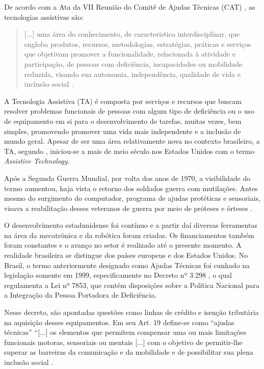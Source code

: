 \documentclass[portuguese]{textolivre}
\begin{document}
De acordo com a Ata da VII Reunião do
Comitê de Ajudas Técnicas (CAT) \cite{brasil2007}, as tecnologias
assistivas são:
\begin{quote}
    {[}...{]} uma área do conhecimento, de característica interdisciplinar,
que engloba produtos, recursos, metodologias, estratégias, práticas e
serviços que objetivam promover a funcionalidade, relacionada à
atividade e participação, de pessoas com deficiência, incapacidades ou
mobilidade reduzida, visando sua autonomia, independência, qualidade de
vida e inclusão social \cite[p.~3]{brasil2007}.
\end{quote}

A Tecnologia Assistiva (TA) é composta por serviços e recursos que
buscam resolver problemas funcionais de pessoas com algum tipo de
deficiência ou o uso de equipamento em si para o desenvolvimento de
tarefas, muitas vezes, bem simples, promovendo promover uma vida mais
independente e a inclusão de mundo geral. Apesar de ser uma área
relativamente nova no contexto brasileiro, a TA, segundo \textcite{soares2017},
iniciou-se a mais de meio século nos Estados Unidos com o termo
\emph{Assistive Technology.}

Após a Segunda Guerra Mundial, por volta dos anos de 1970, a
visibilidade do termo aumentou, haja vista o retorno dos soldados guerra
com mutilações. Antes mesmo do surgimento do computador, programa de
ajudas protéticas e sensoriais, visava a reabilitação desses veteranos
de guerra por meio de próteses e órteses \cite{brasil2009}.

O desenvolvimento estadunidense foi contínuo e a partir daí diversas
ferramentas na área da mecatrônica e da robótica foram criadas. Os
financiamentos também foram constantes e o avanço no setor é realizado
até o presente momento. A realidade brasileira se distingue dos países
europeus e dos Estados Unidos. No Brasil, o termo anteriormente
designado como Ajudas Técnicas foi cunhado na legislação somente em
1999, especificamente no Decreto nº 3.298 \cite{brasil1999}, o qual
regulamenta a Lei nº 7853, que contém disposições sobre a Política
Nacional para a Integração da Pessoa Portadora de Deficiência.

Nesse decreto, são apontadas questões como linhas de crédito e isenção
tributária na aquisição desses equipamentos. Em seu Art. 19 define-se
como ``ajudas técnicas'' ``{[}...{]} os elementos que permitem compensar
uma ou mais limitações funcionais motoras, sensoriais ou mentais
{[}...{]} com o objetivo de permitir-lhe superar as barreiras da
comunicação e da mobilidade e de possibilitar sua plena inclusão social
\cite[Art.~19]{brasil1999}.
\end{document}

